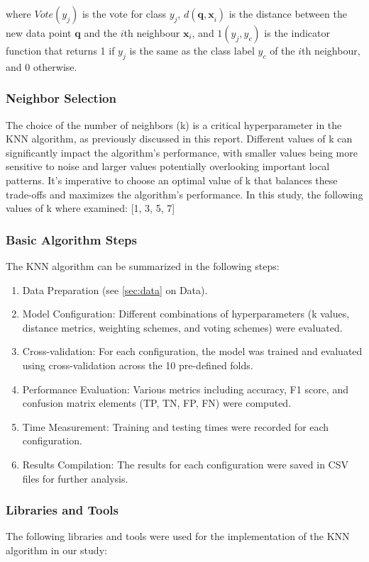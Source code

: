 where \(Vote(y_j)\) is the vote for class \(y_j\), \(d(\mathbf{q,x}_i)\) is the
distance between the new data point \(\mathbf{q}\) and the \(i\)th neighbour \(\mathbf{x}_i\),
and \(1(y_j,y_c)\) is the indicator function that returns 1 if \(y_j\) is the same as
the class label \(y_c\) of the \(i\)th neighbour, and 0 otherwise.\\

\subsubsection*{Neighbor Selection}
The choice of the number of neighbors (k) is a critical hyperparameter in the KNN algorithm, as previously discussed in this report.
Different values of k can significantly impact the algorithm's performance,
with smaller values being more sensitive to noise and larger values potentially overlooking important local patterns.
It's imperative to choose an optimal value of k that balances these trade-offs and maximizes the algorithm's performance.
In this study, the following values of k where examined: [1, 3, 5, 7] \\

\subsubsection*{Basic Algorithm Steps}
The KNN algorithm can be summarized in the following steps:
\begin{enumerate}
    \item Data Preparation (see \autoref{sec:data} on Data).
    \item Model Configuration: Different combinations of hyperparameters (k values, distance metrics, weighting schemes, and voting schemes) were evaluated.
    \item Cross-validation: For each configuration, the model was trained and evaluated using cross-validation across the 10 pre-defined folds.
    \item Performance Evaluation: Various metrics including accuracy, F1 score, and confusion matrix elements (TP, TN, FP, FN) were computed.
    \item Time Measurement: Training and testing times were recorded for each configuration.
    \item Results Compilation: The results for each configuration were saved in CSV files for further analysis.
\end{enumerate}

\subsubsection*{Libraries and Tools}
The following libraries and tools were used for the implementation of the KNN algorithm in our study:

